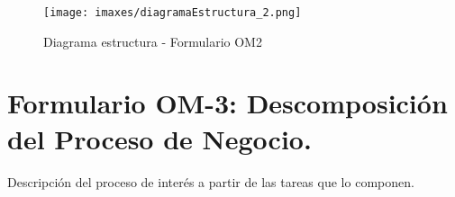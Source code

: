 \begin{figure}[H]
	\centering
	\texttt{[image: imaxes/diagramaEstructura\_2.png]}
	\caption{\label{fig:diagramaEstructura}Diagrama estructura - Formulario OM2}
\end{figure}

\section{Formulario OM-3: Descomposición del Proceso de Negocio.}

Descripción del proceso de interés a partir de las tareas que lo componen.

\begin{table}[H]
  \centering
\end{table}
